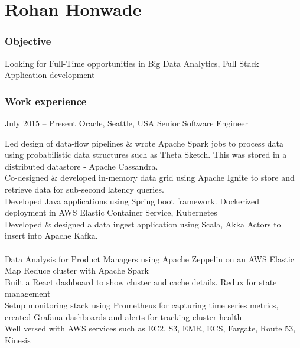 \documentclass{tccv}
\begin{document}
\part{Rohan Honwade}

\section{Objective}
Looking for Full-Time opportunities in Big Data Analytics, Full Stack Application development

\section{Work experience}
\begin{eventlist}
\item{July 2015 -- Present}
     {Oracle, Seattle, USA}
     {Senior Software Engineer}

Led design of data-flow pipelines \& wrote Apache Spark jobs to process data using probabilistic data structures such as Theta Sketch. This was stored in a distributed datastore - Apache Cassandra.\\

Co-designed \& developed in-memory data grid using Apache Ignite to store and retrieve data for sub-second latency queries.\\

Developed Java applications using Spring boot framework. Dockerized deployment in AWS Elastic Container Service, Kubernetes\\

Developed \& designed a data ingest application using Scala, Akka Actors to insert into Apache Kafka.\\
\\

Data Analysis for Product Managers using Apache Zeppelin on an AWS Elastic Map Reduce cluster with Apache Spark\\

Built a React dashboard to show cluster and cache details. Redux for state management\\

Setup monitoring stack using Prometheus for capturing time series metrics, created Grafana dashboards and alerts for tracking cluster health\\

Well versed with AWS services such as EC2, S3, EMR, ECS, Fargate, Route 53, Kinesis


\end{eventlist}
\end{document}
